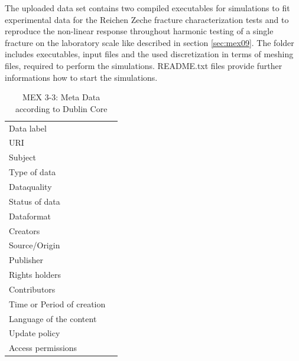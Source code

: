The uploaded data set contains two compiled executables for simulations to fit experimental data for the Reichen Zeche fracture characterization tests and to reproduce the non-linear response throughout harmonic testing of a single fracture on the laboratory scale like described in section \ref{sec:mex09}. The folder includes executables, input files and the used discretization in terms of meshing files, required to perform the simulations. README.txt files provide further informations how to start the simulations.

\begin{table}[h!]
\caption{MEX 3-3: Meta Data according to Dublin Core}
\label{tab:}
\small
\begin{tabular}{R{3cm}|L{7cm}}
\hline
%
Data label &  \\
URI &  \\
Subject  &  \\
Type of data  &  \\
Dataquality  &  \\
Status of data  &  \\
Dataformat  & \\
Creators  &  \\
Source/Origin &  \\
Publisher  &  \\
Rights holders &  \\
Contributors &  \\
Time or Period of creation &  \\
Language of the content &  \\
Update policy &  \\
Access permissions &  \\
%
\hline
\end{tabular}
\end{table}